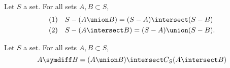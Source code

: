 \begin{prop}
  Let $S$ a set.
  For all sets $A, B \subset S$,
  \[
    \begin{aligned}
      \text{(1)} \quad & S - (A \union B) = (S - A) \intersect (S - B) \\
      \text{(2)} \quad & S - (A \intersect B) = (S - A) \union (S - B).
    \end{aligned}
  \]
\end{prop}

\begin{prop}
  Let $S$ a set. For all sets $A, B \subset S$,
  \[
    A \symdiff B = (A \union B) \intersect C_S(A \intersect B)
  \]
\end{prop}
